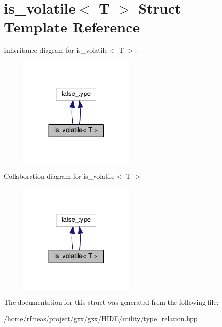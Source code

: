 \hypertarget{structis__volatile}{}\section{is\+\_\+volatile$<$ T $>$ Struct Template Reference}
\label{structis__volatile}


Inheritance diagram for is\+\_\+volatile$<$ T $>$\+:
\nopagebreak
\begin{figure}[H]
\begin{center}
\leavevmode
\includegraphics[width=164pt]{structis__volatile__inherit__graph}
\end{center}
\end{figure}


Collaboration diagram for is\+\_\+volatile$<$ T $>$\+:
\nopagebreak
\begin{figure}[H]
\begin{center}
\leavevmode
\includegraphics[width=164pt]{structis__volatile__coll__graph}
\end{center}
\end{figure}


The documentation for this struct was generated from the following file\+:\begin{DoxyCompactItemize}
\item 
/home/rfmeas/project/gxx/gxx/\+H\+I\+D\+E/utility/type\+\_\+relation.\+hpp\end{DoxyCompactItemize}
